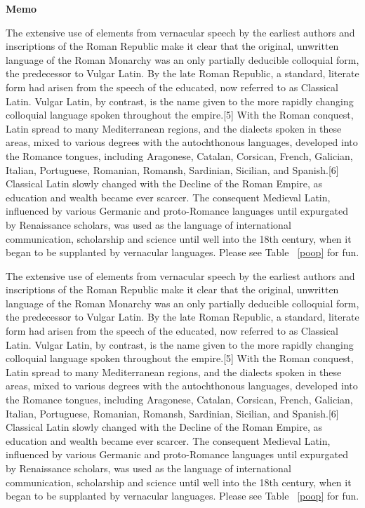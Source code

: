 \documentclass{paper}
\begin{document}
\textbf{Memo}

The extensive use of elements from vernacular speech by the earliest authors and inscriptions of the Roman Republic make it clear that the original, unwritten language of the Roman Monarchy was an only partially deducible colloquial form, the predecessor to Vulgar Latin. By the late Roman Republic, a standard, literate form had arisen from the speech of the educated, now referred to as Classical Latin. Vulgar Latin, by contrast, is the name given to the more rapidly changing colloquial language spoken throughout the empire.[5] With the Roman conquest, Latin spread to many Mediterranean regions, and the dialects spoken in these areas, mixed to various degrees with the autochthonous languages, developed into the Romance tongues, including Aragonese, Catalan, Corsican, French, Galician, Italian, Portuguese, Romanian, Romansh, Sardinian, Sicilian, and Spanish.[6] Classical Latin slowly changed with the Decline of the Roman Empire, as education and wealth became ever scarcer. The consequent Medieval Latin, influenced by various Germanic and proto-Romance languages until expurgated by Renaissance scholars, was used as the language of international communication, scholarship and science until well into the 18th century, when it began to be supplanted by vernacular languages. Please see Table ~\ref{poop} for fun.


The extensive use of elements from vernacular speech by the earliest authors and inscriptions of the Roman Republic make it clear that the original, unwritten language of the Roman Monarchy was an only partially deducible colloquial form, the predecessor to Vulgar Latin. By the late Roman Republic, a standard, literate form had arisen from the speech of the educated, now referred to as Classical Latin. Vulgar Latin, by contrast, is the name given to the more rapidly changing colloquial language spoken throughout the empire.[5] With the Roman conquest, Latin spread to many Mediterranean regions, and the dialects spoken in these areas, mixed to various degrees with the autochthonous languages, developed into the Romance tongues, including Aragonese, Catalan, Corsican, French, Galician, Italian, Portuguese, Romanian, Romansh, Sardinian, Sicilian, and Spanish.[6] Classical Latin slowly changed with the Decline of the Roman Empire, as education and wealth became ever scarcer. The consequent Medieval Latin, influenced by various Germanic and proto-Romance languages until expurgated by Renaissance scholars, was used as the language of international communication, scholarship and science until well into the 18th century, when it began to be supplanted by vernacular languages. Please see Table ~\ref{poop} for fun.
\end{document}
